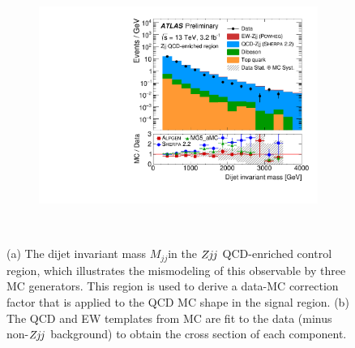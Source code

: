 \documentclass{PoS}
\def\zjj{\ensuremath{Z\kern -0.1em j\kern -0.1emj}\xspace}
\def\mjj{\ensuremath{M_{jj}}}
\begin{document}
\begin{figure}
  \centering
  \begin{subfigure}[t]{0.50\textwidth}
  \includegraphics[width=.99\textwidth]{STDM-2016-09/fig_02b.pdf}\vspace{-6mm}
  \caption{}
  \end{subfigure}%
  ~
  \begin{subfigure}[t]{0.50\textwidth}
    \vspace{-6mm}
  \caption{}
  \end{subfigure}%
  \caption{(a) The dijet invariant mass \mjj in the \zjj QCD-enriched control region, which illustrates
the mismodeling of this observable by three MC generators. This region is used to derive a data-MC
correction factor that is applied to the QCD MC shape in the signal region.
(b) The QCD and EW templates from MC are fit to the data (minus non-\zjj background) to obtain the
cross section of each component.
}
  \label{zjj-dijet-post-fit}
\end{figure}
\end{document}
